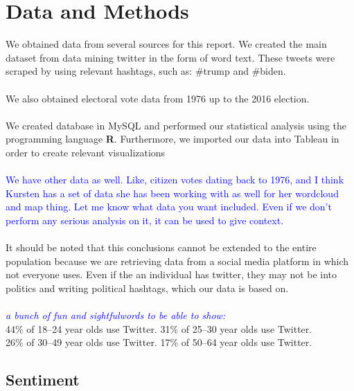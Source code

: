 \documentclass[11pt, oneside]{article}
\begin{document}
\section{Data and Methods}
We obtained data from several sources for this report. We created the main dataset from data mining twitter in the form of word text. These tweets were scraped by using relevant hashtags, such as: \#trump and \#biden.\\
\\
We also obtained electoral vote data from 1976 up to the 2016 election.\\
\\
We created database in MySQL and performed our statistical analysis using the programming language \textbf\textsf{R}. Furthermore, we imported our data into Tableau in order to create relevant visualizations\\
\\
\textcolor{blue}{We have other data as well. Like, citizen votes dating back to 1976, and I think Kursten has a set of data she has been working with as well for her wordcloud and map thing. Let me know what data you want included. Even if we don't perform any serious analysis on it, it can be used to give context.}\\
\\
It should be noted that this conclusions cannot be extended to the entire population because we are retrieving data from a social media platform in which not everyone uses. Even if the an individual has twitter, they may not be into politics and writing political hashtags, which our data is based on.\\
\\
\textcolor{blue}{\emph{a bunch of fun and sightfulwords to be able to show:}}\\
44\% of 18–24 year olds use Twitter. 31\% of 25–30 year olds use Twitter.\\
26\% of 30–49 year olds use Twitter. 17\% of 50–64 year olds use Twitter.\\


\subsection{Sentiment}
\end{document}
